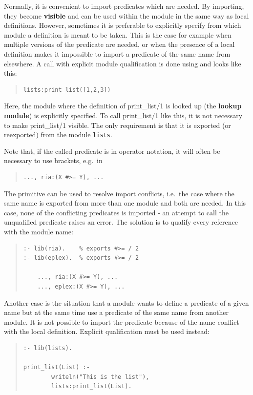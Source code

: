 Normally, it is convenient to import predicates which are needed.
By importing, they become {\bf visible} and can be used within
the module in the same way as local definitions.
However, sometimes it is preferable to explicitly specify from
which module a definition is meant to be taken. This is the case for
example when multiple versions of the predicate are needed,
or when the presence of a local definition makes it impossible
to import a predicate of the same name from elsewhere.
A call with explicit module qualification is done using
and looks like this:
\begin{quote}\begin{verbatim}
lists:print_list([1,2,3])
\end{verbatim}\end{quote}
Here, the module where the definition of print_list/1 is looked up
(the {\bf lookup module}) is explicitly specified. To call print_list/1
like this, it is not necessary to make print_list/1 visible.
The only requirement is that it is exported (or reexported) from
the module {\tt lists}.

Note that, if the called predicate is in operator notation, it will
often be necessary to use brackets, e.g.\ in
\begin{quote}\begin{verbatim}
..., ria:(X #>= Y), ...
\end{verbatim}\end{quote}

The  primitive can be used to resolve import conflicts,
i.e.\ the case where the same name is exported from more than one
module and both are needed. In this case, none of the conflicting
predicates is imported - an attempt to call the unqualified predicate
raises an error.
The solution is to qualify every reference with the module name:
\begin{quote}\begin{verbatim}
:- lib(ria).    % exports #>= / 2
:- lib(eplex).  % exports #>= / 2

    ..., ria:(X #>= Y), ...
    ..., eplex:(X #>= Y), ...
\end{verbatim}\end{quote}

Another case is the situation that a module wants to define a
predicate of a given name but at the same time use a predicate
of the same name from another module. It is not possible to
import the predicate because of the name conflict with the local
definition. Explicit qualification must be used instead:
\begin{quote}\begin{verbatim}
:- lib(lists).

print_list(List) :-
        writeln("This is the list"),
        lists:print_list(List).
\end{verbatim}\end{quote}


